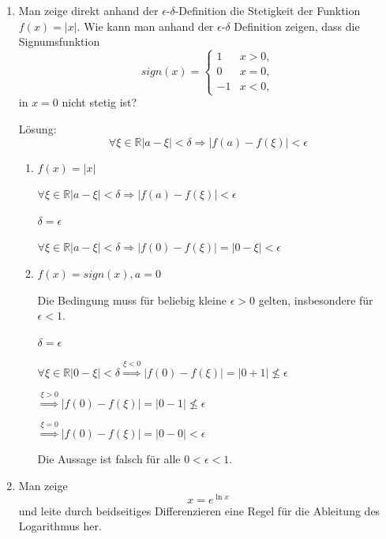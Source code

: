 \documentclass[main.tex]{subfiles}
\begin{document}
\begin{enumerate}
	\item Man zeige direkt anhand der \( \epsilon \)-\( \delta \)-Definition die Stetigkeit der Funktion
	      \( f(x) = |x| \).
	      Wie kann man anhand der \( \epsilon \)-\(\delta \) Definition zeigen, dass die Signumsfunktion
	      \[ sign(x)= \begin{cases}
			      1  & x > 0, \\
			      0  & x = 0, \\
			      -1 & x < 0,
		      \end{cases}
	      \]
	      in \( x = 0 \) nicht stetig ist?

	      Lösung:
	      \[ \forall \xi \in \mathbb{R} | a - \xi | < \delta \Rightarrow | f(a) - f(\xi) | < \epsilon \]
	      \begin{enumerate}
		      \item \( f(x) = |x| \)

		            \( \forall \xi \in \mathbb{R} | a - \xi | < \delta \Rightarrow | f(a) - f(\xi) | < \epsilon \)

		            \( \delta = \epsilon \)

		            \( \forall \xi \in \mathbb{R} | a - \xi | < \delta \Rightarrow | f(0) - f(\xi) | = | 0 - \xi | < \epsilon \)
		      \item \( f(x) = sign(x), a = 0 \)

		            Die Bedingung muss für beliebig kleine \( \epsilon > 0 \) gelten, insbesondere für \( \epsilon < 1 \).

		            \( \delta = \epsilon \)

		            \( \forall \xi \in \mathbb{R} | 0 - \xi | < \delta \stackrel{\xi < 0}{\Rightarrow} | f(0) - f(\xi) | = | 0 + 1| \nleq \epsilon \)

		            \hspace{75pt} \( \stackrel{\xi > 0}{\Rightarrow} | f(0) - f(\xi) |  = | 0 - 1| \nleq \epsilon \)

		            \hspace{75pt} \( \stackrel{\xi = 0}{\Rightarrow} | f(0) - f(\xi) |  = | 0 - 0| < \epsilon \)

		            Die Aussage ist falsch für alle \( 0 < \epsilon < 1 \).
	      \end{enumerate}
	\item Man zeige
	      \[ x = e^{\ln{x}} \]
	      und leite durch beidseitiges Differenzieren eine Regel für
	      die Ableitung des Logarithmus her.


\end{enumerate}
\end{document}

